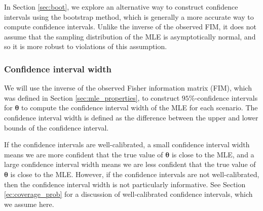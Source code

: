 \documentclass[
]{article}
\begin{document}
In Section \ref{sec:boot}, we explore an alternative way to construct
confidence intervals using the bootstrap method, which is generally a
more accurate way to compute confidence intervals. Unlike the inverse of
the observed FIM, it does not assume that the sampling distribution of
the MLE is asymptotically normal, and so it is more robust to violations
of this assumption.

\hypertarget{confidence-interval-width}{%
\subsubsection{Confidence interval
width}\label{confidence-interval-width}}

We will use the inverse of the observed Fisher information matrix (FIM),
which was defined in Section \ref{sec:mle_properties}, to construct
\(95\%\)-confidence intervals for \(\boldsymbol{\theta}\) to compute the
confidence interval width of the MLE for each scenario. The confidence
interval width is defined as the difference between the upper and lower
bounds of the confidence interval.

If the confidence intervals are well-calibrated, a small confidence
interval width means we are more confident that the true value of
\(\boldsymbol{\theta}\) is close to the MLE, and a large confidence
interval width means we are less confident that the true value of
\(\boldsymbol{\theta}\) is close to the MLE. However, if the confidence
intervals are not well-calibrated, then the confidence interval width is
not particularly informative. See Section \ref{ec:coverage_prob} for a
discussion of well-calibrated confidence intervals, which we assume
here.
\end{document}
